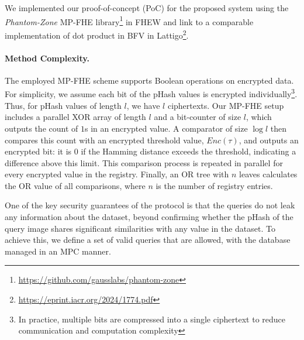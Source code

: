 \noindent We implemented our proof-of-concept (PoC) for the proposed system using the \emph{Phantom-Zone} MP-FHE library\footnote{\url{https://github.com/gausslabs/phantom-zone}} in FHEW and link to a comparable implementation of dot product in BFV in Lattigo\footnote{\url{https://eprint.iacr.org/2024/1774.pdf}}. 

\vspace{-0.5cm}\paragraph{\textbf{Method Complexity.}}
The employed MP-FHE scheme supports Boolean operations on encrypted data. For simplicity, we assume each bit of the pHash values is encrypted individually\footnote{In practice, multiple bits are compressed into a single ciphertext to reduce communication and computation complexity}. Thus, for pHash values of length $l$, we have $l$ ciphertexts.  Our MP-FHE setup includes a parallel XOR array of length $l$ and a bit-counter of size $l$, which outputs the count of $1$s in an encrypted value. A comparator of size $\log l$ then compares this count with an encrypted threshold value, $Enc(\tau)$, and outputs an encrypted bit: it is $0$ if the Hamming distance exceeds the threshold, indicating a difference above this limit. This comparison process is repeated in parallel for every encrypted value in the registry. Finally, an OR tree with $n$ leaves calculates the OR value of all comparisons, where $n$ is the number of registry entries.


















One of the key security guarantees of the protocol is that the queries do not leak any information about the dataset, beyond confirming whether the pHash of the query image shares significant similarities with any value in the dataset. To achieve this, we define a set of valid queries that are allowed, with the database managed in an MPC manner.







